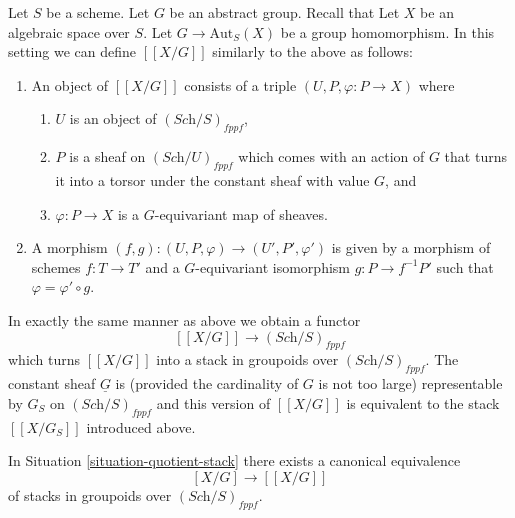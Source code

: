 \begin{remark}
\label{remark-X-mod-G-group}
Let $S$ be a scheme.
Let $G$ be an abstract group.
Recall that 
Let $X$ be an algebraic space over $S$.
Let $G \to \text{Aut}_S(X)$ be a group homomorphism.
In this setting we can define $[[X/G]]$ similarly
to the above as follows:
\begin{enumerate}
\item An object of $[[X/G]]$ consists of a triple
$(U, P, \varphi : P \to X)$ where
\begin{enumerate}
\item $U$ is an object of $(\textit{Sch}/S)_{fppf}$,
\item $P$ is a sheaf on $(\textit{Sch}/U)_{fppf}$ which comes
with an action of $G$ that turns it into a torsor under the constant
sheaf with value $G$, and
\item $\varphi : P \to X$ is a $G$-equivariant map of sheaves.
\end{enumerate}
\item A morphism
$(f, g) : (U, P, \varphi) \to (U', P', \varphi')$
is given by a morphism of schemes $f : T \to T'$
and a $G$-equivariant isomorphism
$g : P \to f^{-1}P'$ such that $\varphi = \varphi' \circ g$.
\end{enumerate}
In exactly the same manner as above we obtain a functor
$$
[[X/G]] \longrightarrow (\textit{Sch}/S)_{fppf}
$$
which turns $[[X/G]]$ into a stack in groupoids over $(\textit{Sch}/S)_{fppf}$.
The constant sheaf $\underline{G}$ is (provided the cardinality of $G$ is
not too large) representable by $G_S$ on $(\textit{Sch}/S)_{fppf}$
and this version of $[[X/G]]$ is equivalent to the stack
$[[X/G_S]]$ introduced above.
\end{remark}

\begin{proposition}
\label{proposition-equal-quotient-stacks}
In
Situation \ref{situation-quotient-stack}
there exists a canonical equivalence
$$
[X/G] \longrightarrow [[X/G]]
$$
of stacks in groupoids over $(\textit{Sch}/S)_{fppf}$.
\end{proposition}

